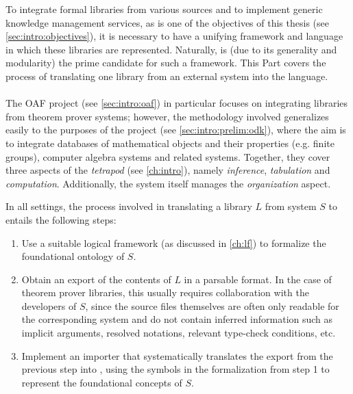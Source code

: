 To integrate formal libraries from various sources and to implement generic knowledge management services, as is one of the objectives of this thesis (see \autoref{sec:intro:objectives}), it is necessary to have a unifying framework and language in which these libraries are represented. Naturally, \ommt is (due to its generality and modularity) the prime candidate for such a framework. This Part covers the process of translating one library from an external system into the \ommt language.

\paragraph{} The OAF project (see \autoref{sec:intro:oaf}) in particular focuses on integrating libraries from theorem prover systems; however, the methodology involved generalizes easily to the purposes of the \ODK project (see \autoref{sec:intro:prelim:odk}), where the aim is to integrate databases of mathematical objects and their properties (e.g. finite groups), computer algebra systems and related systems. Together, they cover three aspects of the \emph{tetrapod} (see \autoref{ch:intro}), namely \emph{inference}, \emph{tabulation} and \emph{computation}. Additionally, the \mmt system itself manages the \emph{organization} aspect.

In all settings, the process involved in translating a library $L$ from system $S$ to \ommt entails the following steps:
\begin{enumerate}
	\item Use a suitable logical framework (as discussed in \autoref{ch:lf}) to formalize the foundational ontology of $S$.
	\item Obtain an export of the contents of $L$ in a parsable format. In the case of theorem prover libraries, this usually requires collaboration with the developers of $S$, since the source files themselves are often only readable for the corresponding system and do not contain inferred information such as implicit arguments, resolved notations, relevant type-check conditions, etc.
	\item Implement an importer that systematically translates the export from the previous step into \ommt, using the symbols in the formalization from step 1 to represent the foundational concepts of $S$.
\end{enumerate}

